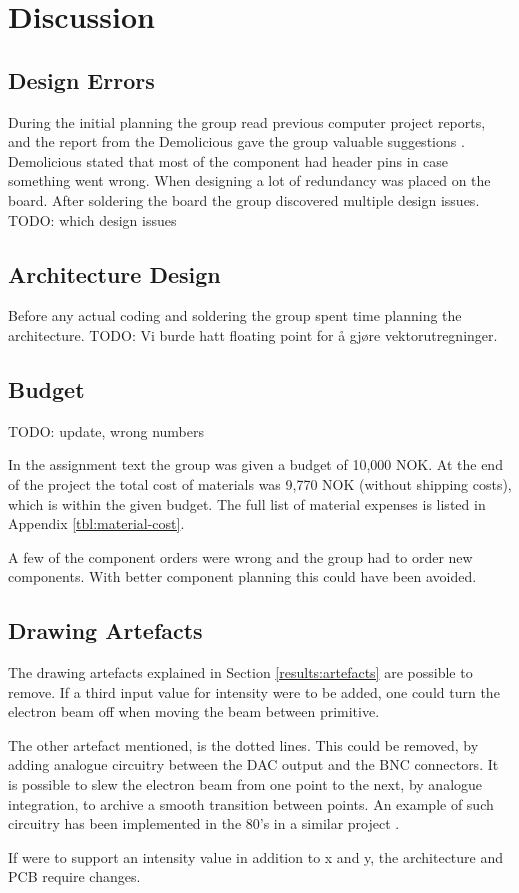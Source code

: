 \chapter{Discussion}

\section{Design Errors}
During the initial planning the group read previous computer project reports,
and the report from the Demolicious gave the group valuable suggestions \cite{demolicious-report}.
Demolicious stated that most of the component had header pins in case something went wrong.
When designing a lot of redundancy was placed on the board.
After soldering the board the group discovered multiple design issues. TODO: which design issues

\section{Architecture Design}
Before any actual coding and soldering the group spent time planning the architecture.
TODO: Vi burde hatt floating point for å gjøre vektorutregninger.

\section{Budget}
TODO: update, wrong numbers

In the assignment text the group was given a budget of 10,000 NOK.
At the end of the project the total cost of materials was 9,770 NOK (without shipping costs), which is within the given budget.
The full list of material expenses is listed in Appendix \ref{tbl:material-cost}.

A few of the component orders were wrong and the group had to order new components.
With better component planning this could have been avoided.



\section{Drawing Artefacts}
\label{discussion:artefacts}
The drawing artefacts explained in Section \ref{results:artefacts} are possible to remove.
If a third input value for intensity were to be added, one could turn the electron beam off when moving the beam between primitive.

The other artefact mentioned, is the dotted lines.
This could be removed, by adding analogue circuitry between the DAC output and the BNC connectors.
It is possible to slew the electron beam from one point to the next, by analogue integration, to archive a smooth transition between points.
An example of such circuitry has been implemented in the 80's in a similar project \cite{vector-graphic-crt}.


If \vthreek were to support an intensity value in addition to x and y, the architecture and PCB require changes.
